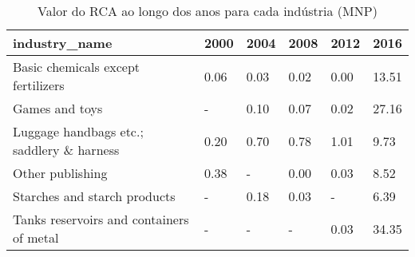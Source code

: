 \begin{table}
\centering
\caption{Valor do RCA ao longo dos anos para cada indústria (MNP)}
\begin{tabular}{p{6cm}p{1.5cm}p{1.5cm}p{1.5cm}p{1.5cm}p{1.5cm}}
\toprule
                            industry\_name & 2000 & 2004 & 2008 & 2012 &  2016 \\
\midrule
       Basic chemicals except fertilizers & 0.06 & 0.03 & 0.02 & 0.00 & 13.51 \\
                           Games and toys &    - & 0.10 & 0.07 & 0.02 & 27.16 \\
Luggage handbags etc.; saddlery \& harness & 0.20 & 0.70 & 0.78 & 1.01 &  9.73 \\
                         Other publishing & 0.38 &    - & 0.00 & 0.03 &  8.52 \\
             Starches and starch products &    - & 0.18 & 0.03 &    - &  6.39 \\
 Tanks reservoirs and containers of metal &    - &    - &    - & 0.03 & 34.35 \\
\bottomrule
\end{tabular}
\end{table}
